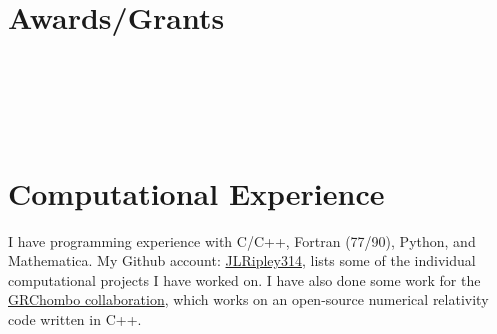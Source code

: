 \documentclass{my_cv}
\begin{document}
\section{Awards/Grants}
\noindent
{}
\\ \\
\\ \\
\section{Computational Experience}
   I have programming experience with C/C++, Fortran (77/90), Python,
   and Mathematica.
   My Github account: \href{https://github.com/JLRipley314}{JLRipley314},
   lists some of the individual computational projects I have worked on.
   I have also done some work for the
   \href{https://www.grchombo.org/}{GRChombo collaboration}, 
   which works on an open-source numerical relativity code written in C++.
\end{document}
